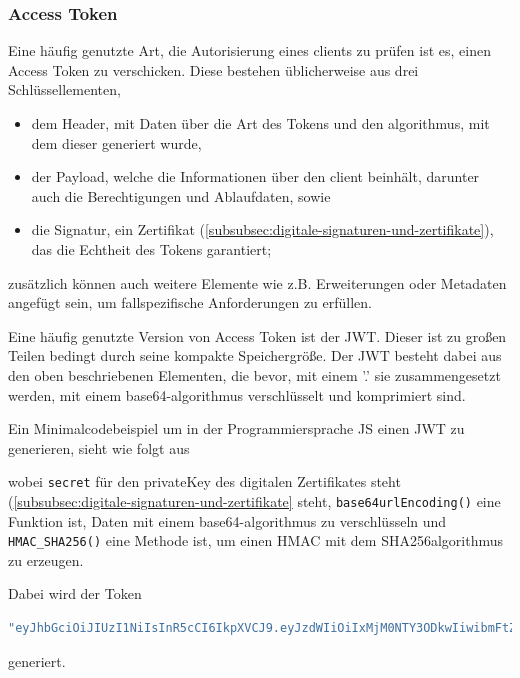 \subsubsection[Token-Verfahren]{Access Token}\label{subsubsec:access-token}
Eine häufig genutzte Art, die Autorisierung eines \glspl{client} zu prüfen ist es, einen Access Token zu verschicken.
Diese bestehen üblicherweise aus drei Schlüssellementen, 
\begin{itemize}
    \item dem Header, mit Daten über die Art des Tokens und den \gls{algorithmus}, mit dem dieser generiert wurde,
    \item der Payload, welche die Informationen über den \gls{client} beinhält, darunter auch die Berechtigungen und Ablaufdaten, sowie 
    \item die Signatur, ein Zertifikat (\autoref{subsubsec:digitale-signaturen-und-zertifikate}), das die Echtheit des Tokens garantiert;
\end{itemize}\label{itm:TokenElemente}
zusätzlich können auch weitere Elemente wie z.B. Erweiterungen oder Metadaten angefügt sein, um fallspezifische Anforderungen zu erfüllen. \autocite[\vglf][]{AccessTo39:online}    

Eine häufig genutzte Version von Access Token ist der \ac{JWT}. Dieser ist zu großen Teilen bedingt durch seine kompakte Speichergröße. \autocite[\vglf][]{rfc7519} Der \ac{JWT} besteht dabei aus den oben beschriebenen Elementen, die bevor, mit einem '.'  sie zusammengesetzt werden, mit einem \gls{base64}-\gls{algorithmus} verschlüsselt und komprimiert sind.\autocite[\vglf][]{rfc7519} 

Ein Minimalcodebeispiel um in der Programmiersprache \ac{JS} einen \ac{JWT} zu generieren, sieht wie folgt aus

\label{listing:JWT}

wobei \lstinline!secret! für den \gls{privateKey} des digitalen Zertifikates steht (\autoref{subsubsec:digitale-signaturen-und-zertifikate} steht, \lstinline!base64urlEncoding()! eine Funktion ist, Daten mit einem \gls{base64}-\gls{algorithmus} zu verschlüsseln und \lstinline!HMAC_SHA256()! eine Methode ist, um einen \ac{HMAC} mit dem \gls{SHA256}\nonbreakdash\gls{algorithmus} zu erzeugen.

Dabei wird der Token
\begin{lstlisting}[language = JavaScript]
"eyJhbGciOiJIUzI1NiIsInR5cCI6IkpXVCJ9.eyJzdWIiOiIxMjM0NTY3ODkwIiwibmFtZSI6IkpvaG4gRG9lIiwiaWF0IjoxNTE2MjM5MDIyfQ.SflKxwRJSMeKKF2QT4fwpMeJf36POk6yJV_adQssw5c"
\end{lstlisting}
generiert.

